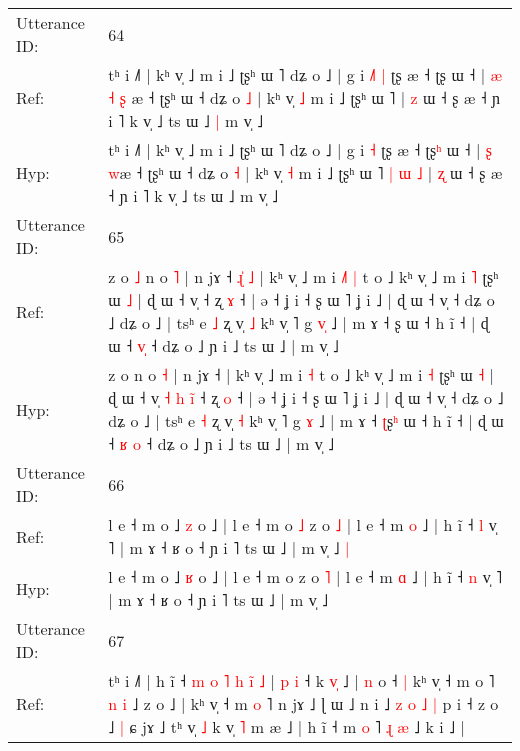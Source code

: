 \documentclass[10pt]{article}
\DeclareRobustCommand{\hl}[1]{{\textcolor{red}{#1}}}
\begin{document}
\begin{longtable}{ll}
 \\
\midrule
Utterance ID: & 64 \\
Ref: & tʰ i ˩˥ | kʰ v̩ ˩ m i ˩ ʈʂʰ ɯ ˥ dʑ o ˩ | g i\hl{ }\hl{˩}\hl{˥} \hl{|} ʈʂ æ ˧ ʈʂ\hl{} ɯ ˧ |\hl{ }\hl{æ} \hl{˧} \hl{ʂ}\hl{ }æ ˧ ʈʂʰ ɯ ˧ dʑ o \hl{˩} | kʰ v̩ \hl{˩} m i ˩ ʈʂʰ ɯ ˥\hl{}\hl{}\hl{}\hl{}\hl{}\hl{} | \hl{z} ɯ ˧ ʂ æ ˧ ɲ i ˥ k v̩ ˩ ts ɯ ˩\hl{ }\hl{|} m v̩ ˩
 \\
Hyp: & tʰ i ˩˥ | kʰ v̩ ˩ m i ˩ ʈʂʰ ɯ ˥ dʑ o ˩ | g i\hl{}\hl{}\hl{} \hl{˧} ʈʂ æ ˧ ʈʂ\hl{ʰ} ɯ ˧ |\hl{}\hl{} \hl{ʂ} \hl{}\hl{w}æ ˧ ʈʂʰ ɯ ˧ dʑ o \hl{˧} | kʰ v̩ \hl{˧} m i ˩ ʈʂʰ ɯ ˥\hl{ }\hl{|}\hl{ }\hl{ɯ}\hl{ }\hl{˩} | \hl{ʐ} ɯ ˧ ʂ æ ˧ ɲ i ˥ k v̩ ˩ ts ɯ ˩\hl{}\hl{} m v̩ ˩
 \\
\midrule
Utterance ID: & 65 \\
Ref: & z o\hl{ }\hl{˩} n o \hl{˥} | n jɤ ˧\hl{ }\hl{ɻ}\hl{̍}\hl{ }\hl{˩} | kʰ v̩ ˩ m i\hl{ }\hl{˩}\hl{˥} \hl{|} t o ˩ kʰ v̩ ˩ m i \hl{˥} ʈʂʰ ɯ \hl{˩} | ɖ ɯ ˧ v̩\hl{}\hl{}\hl{}\hl{}\hl{}\hl{}\hl{} ˧ ʐ \hl{ɤ} ˧ | ə ˧ ʝ i ˧ ʂ ɯ ˥ ʝ i ˩ | ɖ ɯ ˧ v̩ ˧ dʑ o ˩ dʑ o ˩ | tsʰ e \hl{˩} ʐ v̩ \hl{˩} kʰ v̩ ˥ g \hl{v}\hl{̩} ˩ | m ɤ ˧ \hl{}ʂ\hl{} ɯ ˧ h ĩ ˧ | ɖ ɯ ˧ \hl{}\hl{v}\hl{̩} ˧ dʑ o ˩ ɲ i ˩ ts ɯ ˩ | m v̩ ˩
 \\
Hyp: & z o\hl{}\hl{} n o \hl{˧} | n jɤ ˧\hl{}\hl{}\hl{}\hl{}\hl{} | kʰ v̩ ˩ m i\hl{}\hl{}\hl{} \hl{˧} t o ˩ kʰ v̩ ˩ m i \hl{˧} ʈʂʰ ɯ \hl{˧} | ɖ ɯ ˧ v̩\hl{ }\hl{˧}\hl{ }\hl{h}\hl{ }\hl{i}\hl{̃} ˧ ʐ \hl{o} ˧ | ə ˧ ʝ i ˧ ʂ ɯ ˥ ʝ i ˩ | ɖ ɯ ˧ v̩ ˧ dʑ o ˩ dʑ o ˩ | tsʰ e \hl{˧} ʐ v̩ \hl{˧} kʰ v̩ ˥ g \hl{}\hl{ɤ} ˩ | m ɤ ˧ \hl{ʈ}ʂ\hl{ʰ} ɯ ˧ h ĩ ˧ | ɖ ɯ ˧ \hl{ʁ}\hl{ }\hl{o} ˧ dʑ o ˩ ɲ i ˩ ts ɯ ˩ | m v̩ ˩
 \\
\midrule
Utterance ID: & 66 \\
Ref: & l e ˧ m o ˩ \hl{z} o ˩ | l e ˧ m o\hl{ }\hl{˩} z o \hl{˩} | l e ˧ m \hl{o} ˩ | h ĩ ˧ \hl{l} v̩ ˥ | m ɤ ˧ ʁ o ˧ ɲ i ˥ ts ɯ ˩ | m v̩ ˩\hl{ }\hl{|}
 \\
Hyp: & l e ˧ m o ˩ \hl{ʁ} o ˩ | l e ˧ m o\hl{}\hl{} z o \hl{˥} | l e ˧ m \hl{ɑ} ˩ | h ĩ ˧ \hl{n} v̩ ˥ | m ɤ ˧ ʁ o ˧ ɲ i ˥ ts ɯ ˩ | m v̩ ˩\hl{}\hl{}
 \\
\midrule
Utterance ID: & 67 \\
Ref: & tʰ i\hl{} ˩˥ | h ĩ ˧\hl{ }\hl{m}\hl{ }\hl{o}\hl{ }\hl{˥}\hl{ }\hl{h}\hl{ }\hl{i}\hl{̃}\hl{ }\hl{˩} | \hl{p} \hl{i} ˧ k \hl{v}\hl{̩} ˩ | \hl{}\hl{n} o ˧\hl{ }\hl{|} kʰ v̩ ˧ m o ˥ \hl{n} \hl{i} ˩ z o ˩ | kʰ v̩ ˧ m \hl{}\hl{o} ˥\hl{}\hl{} n jɤ ˩ ɭ ɯ ˩ n i ˩ \hl{z} \hl{o} \hl{˩} \hl{|} p i ˧ z o ˩ \hl{|} ɕ jɤ ˩ tʰ v̩ \hl{˩} k v̩ \hl{˥} m æ ˩ | h ĩ ˧ m \hl{o} ˥\hl{ }\hl{ɻ}\hl{ }\hl{æ} ˩ k i ˩ |

\end{longtable}
\end{document}
